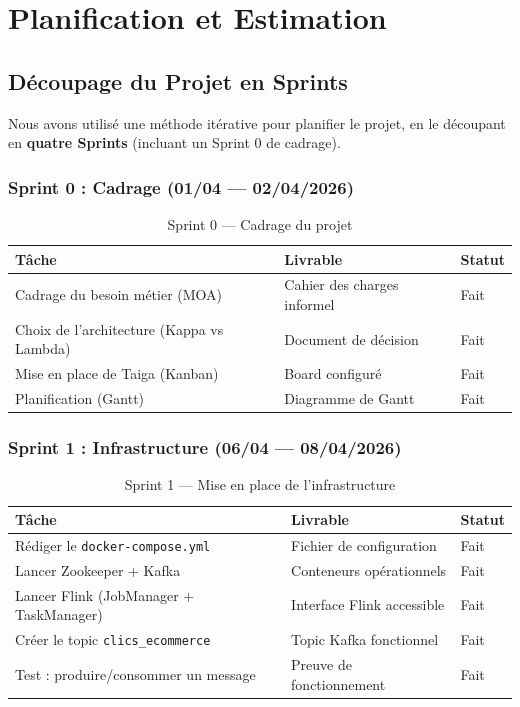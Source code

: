 \chapter{Planification et Estimation}

\section{Découpage du Projet en Sprints}

Nous avons utilisé une méthode itérative pour planifier le projet, en le découpant en \textbf{quatre Sprints} (incluant un Sprint 0 de cadrage).

\subsection{Sprint 0 : Cadrage (01/04 --- 02/04/2026)}

\begin{table}[H]
\centering
\begin{tabularx}{\textwidth}{X L{5cm} C{2cm}}
\toprule
\textbf{\color{primarycolor}Tâche} &
\textbf{\color{primarycolor}Livrable} &
\textbf{\color{primarycolor}Statut} \\
\midrule
Cadrage du besoin métier (MOA) & Cahier des charges informel & Fait \\
Choix de l'architecture (Kappa vs Lambda) & Document de décision & Fait \\
Mise en place de Taiga (Kanban) & Board configuré & Fait \\
Planification (Gantt) & Diagramme de Gantt & Fait \\
\bottomrule
\end{tabularx}
\caption{Sprint 0 --- Cadrage du projet}
\end{table}

\subsection{Sprint 1 : Infrastructure (06/04 --- 08/04/2026)}

\begin{table}[H]
\centering
\begin{tabularx}{\textwidth}{X L{5cm} C{2cm}}
\toprule
\textbf{\color{primarycolor}Tâche} &
\textbf{\color{primarycolor}Livrable} &
\textbf{\color{primarycolor}Statut} \\
\midrule
Rédiger le \texttt{docker-compose.yml} & Fichier de configuration & Fait \\
Lancer Zookeeper + Kafka & Conteneurs opérationnels & Fait \\
Lancer Flink (JobManager + TaskManager) & Interface Flink accessible & Fait \\
Créer le topic \texttt{clics\_ecommerce} & Topic Kafka fonctionnel & Fait \\
Test : produire/consommer un message & Preuve de fonctionnement & Fait \\
\bottomrule
\end{tabularx}
\caption{Sprint 1 --- Mise en place de l'infrastructure}
\end{table}

